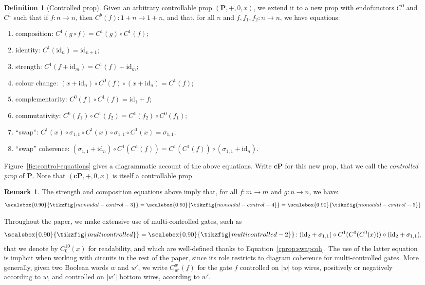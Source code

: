 \documentclass[a4paper]{article}
\theoremstyle{plain}
\theoremstyle{definition}
\newtheorem{definition}[theorem]{Definition}
\newtheorem{remark}[theorem]{Remark}
\newcommand{\tf}[1]{\scalebox{0.90}{\tikzfig{#1}}}
\newcommand{\cat}[1]{\mathbf{#1}}
\newcommand{\ccat}[1]{\mathbf{c #1}}
\newcommand{\abs}[1]{\left\vert #1 \right\vert}
\newcommand{\iid}{\mathrm{id}}
\begin{document}
\begin{definition}[Controlled prop]
	\label{def:cprop}
	Given an arbitrary controllable prop $(\cat P, +, 0, x)$, we extend it to a
	new prop with endofunctors $C^0$ and $C^1$ such that if $f \colon n \to n$,
	then $C^b(f) \colon 1+n \to 1+n$, and that, for all $n$ and $f, f_1, f_2
	\colon n \to n$, we have equations:
	\begin{enumerate}[(\alph*)]
		\item\label{cprop:composition} composition:
			$C^1(g \circ f) = C^1(g) \circ C^1(f)$;
		\item\label{cprop:identity} identity:
			$C^1(\iid_n) = \iid_{n+1}$;
		\item\label{cprop:strength} strength:
			$C^1(f + \iid_m) = C^1(f) + \iid_m$;
		\item\label{cprop:colour} colour change:
			$(x + \iid_n) \circ C^0(f) \circ (x + \iid_n) = C^1(f)$;
		\item\label{cprop:complementarity} complementarity:
			$C^0(f) \circ C^1(f) = \iid_1 + f$;
		\item\label{cprop:commutativity} commutativity:
			$C^0(f_1) \circ C^1(f_2) = C^1(f_2) \circ C^0(f_1)$;
		\item\label{cprop:swap} ``swap'':
			$C^1(x) \circ \sigma_{1,1} \circ C^1(x) \circ \sigma_{1,1} \circ C^1(x)
			= \sigma_{1,1}$;
		\item\label{cprop:swapcoh} ``swap'' coherence:
			$(\sigma_{1,1} + \iid_n) \circ C^1(C^1(f)) = C^1(C^1(f))
			\circ (\sigma_{1,1} + \iid_n)$.
	\end{enumerate}
	Figure~\ref{fig:control-equations} gives a diagrammatic account of
	the above equations. Write $\ccat P$ for this new prop, that we call
	the \emph{controlled prop} of $\cat P$. Note that $(\ccat P, +, 0, x)$ is
	itself a controllable prop.
\end{definition}

\begin{remark}
	The strength and composition equations above imply that, for all $f
	\colon m \to m$ and $g \colon n \to n$, we have:
	\[
		\tf{monoidal-control-3}
		= \tf{monoidal-control-4}
		= \tf{monoidal-control-5}
	\]
\end{remark}


Throughout the paper, we make extensive use of multi-controlled gates, such as
\[
	\tf{multicontrolled} = \tf{multicontrolled-2}
	\colon
	(\iid_2 + \sigma_{1,1})
	\circ C^1(C^0(C^0(x)))
	\circ (\iid_2 + \sigma_{1,1})\text,
\]
that we denote by $C^{10}_0(x)$ for readability, and which are well-defined
thanks to Equation~\ref{cprop:swapcoh}. The use of the latter equation is
implicit when working with circuits in the rest of the paper, since its role
restricts to diagram coherence for multi-controlled gates. More generally,
given two Boolean words $w$ and $w'$, we write $C^w_{w'}(f)$ for the gate $f$
controlled on $\abs w$ top wires, positively or negatively according to $w$,
and controlled on $\abs{w'}$ bottom wires, according to $w'$.
\end{document}
